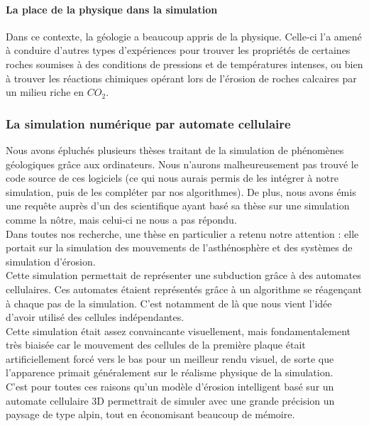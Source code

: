\documentclass[a4paper,11pt]{article}
\begin{document}
\paragraph{La place de la physique dans la simulation}
\medbreak
Dans ce contexte, la géologie a beaucoup appris de la physique. Celle-ci l'a amené à conduire d'autres types d'expériences pour trouver les propriétés de certaines roches soumises à des conditions de pressions et de températures intenses, ou bien à trouver les réactions chimiques opérant lors de l'érosion de roches calcaires par un milieu riche en $CO_2$.

\subsubsection{La simulation numérique par automate cellulaire}

Nous avons épluchés plusieurs thèses traitant de la simulation de phénomènes géologiques grâce aux ordinateurs.
Nous n'aurons malheureusement pas trouvé le code source de ces logiciels (ce qui nous aurais permis de les intégrer à notre simulation, puis de les compléter par nos algorithmes). De plus, nous avons émis une requête auprès d'un des scientifique ayant basé sa thèse sur une simulation comme la nôtre, mais celui-ci ne nous a pas répondu. \\
Dans toutes nos recherche, une thèse en particulier a retenu notre attention : elle portait sur la simulation des mouvements de l’asthénosphère et des systèmes de simulation d'érosion.\\
Cette simulation permettait de représenter une subduction grâce à des automates cellulaires.
Ces automates étaient représentés grâce à un algorithme se réagençant à chaque pas de la simulation.
C'est notamment de là que nous vient l'idée d'avoir utilisé des cellules indépendantes.\\
Cette simulation était assez convaincante visuellement, mais fondamentalement très biaisée car le mouvement des cellules de la première plaque était artificiellement forcé vers le bas pour un meilleur rendu visuel, de sorte que l'apparence primait généralement sur le réalisme physique de la simulation.\\
C'est pour toutes ces raisons qu'un modèle d'érosion intelligent basé sur un automate cellulaire 3D permettrait de simuler avec une grande précision un paysage de type alpin, tout en économisant beaucoup de mémoire.
\end{document}
